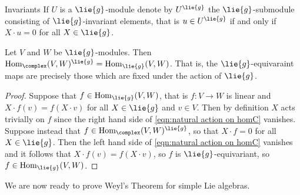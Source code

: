 \documentclass[fleqn]{NotesClass}
\DeclareMathOperator{\Hom}{Hom}
\begin{document}
    \begin{dfn}{Invariants}{}
        If \(U\) is a \(\lie{g}\)-module denote by \(U^{\lie{g}}\) the \(\lie{g}\)-submodule consisting of \(\lie{g}\)-invariant elements, that is \(u \in U^{\lie{g}}\) if and only if \(X \cdot u = 0\) for all \(X \in \lie{g}\).
    \end{dfn}
    
    \begin{lma}{}{}
        Let \(V\) and \(W\) be \(\lie{g}\)-modules.
        Then \(\Hom_{\complex}(V, W)^{\lie{g}} = \Hom_{\lie{g}}(V, W)\).
        That is, the \(\lie{g}\)-equivaraint maps are precisely those which are fixed under the action of \(\lie{g}\).
        \begin{proof}
            Suppose that \(f \in \Hom_{\lie{g}}(V, W)\), that is \(f \colon V \to W\) is linear and \(X \cdot f(v) = f(X \cdot v)\) for all \(X \in \lie{g}\) and \(v \in V\).
            Then by definition \(X\) acts trivially on \(f\) since the right hand side of \cref{eqn:natural action on homC} vanishes.
            Suppose instead that \(f \in \Hom_{\complex}(V, W)^{\lie{g}}\), so that \(X \cdot f = 0\) for all \(X \in \lie{g}\).
            Then the left hand side of \cref{eqn:natural action on homC} vanishes and it follows that \(X \cdot f(v) = f(X \cdot v)\), so \(f\) is \(\lie{g}\)-equivariant, so \(f \in \Hom_{\lie{g}}(V, W)\).
        \end{proof}
    \end{lma}
    
    We are now ready to prove Weyl's Theorem for simple Lie algebras.
    
\end{document}
